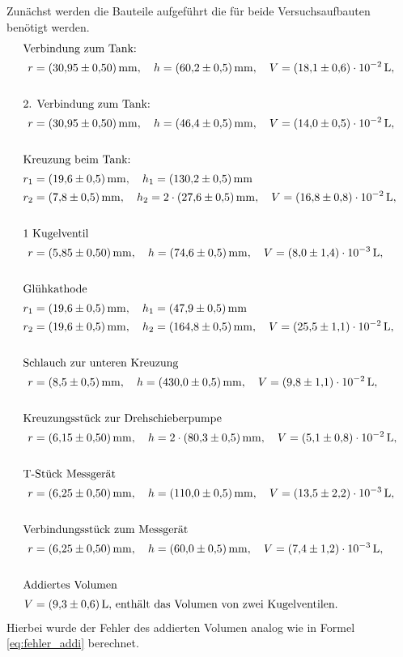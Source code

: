 Zunächst werden die Bauteile aufgeführt die für beide Versuchsaufbauten benötigt werden.
\begin{align*}
  \shortintertext{Verbindung zum Tank:}
  r&=\SI{30.95\pm 0.5}{\milli\meter}, \quad h=\SI{60.2\pm0.5}{\milli\meter}, \quad V=\SI{ 18.1\pm0.6 e-2}{\litre},\\
  \\
  \shortintertext{2. Verbindung zum Tank:}
  r&=\SI{30.95\pm 0.5}{\milli\meter}, \quad h=\SI{46.4\pm0.5}{\milli\meter}, \quad V=\SI{ 14.0\pm0.5 e-2}{\litre},\\
  \\
  \shortintertext{Kreuzung beim Tank:}
  r_1&=\SI{19.6\pm 0.5}{\milli\meter}, \quad h_1=\SI{130.2\pm0.5}{\milli\meter}\\
  r_2&=\SI{7.8\pm 0.5}{\milli\meter}, \quad h_2=2\cdot  \SI{27.6\pm0.5}{\milli\meter}, \quad V=\SI{ 16.8\pm0.8 e-2}{\litre},\\
  \\
  \shortintertext{1 Kugelventil}
  r&=\SI{5.85\pm 0.5}{\milli\meter}, \quad h=\SI{74.6\pm0.5}{\milli\meter}, \quad V=\SI{ 8.0\pm1.4 e-3}{\litre},\\
  \\
  \shortintertext{Glühkathode}
  r_1&=\SI{19.6\pm 0.5}{\milli\meter}, \quad h_1=\SI{47.9\pm0.5}{\milli\meter}\\
  r_2&=\SI{19.6\pm 0.5}{\milli\meter}, \quad h_2=\SI{164.8\pm0.5}{\milli\meter}, \quad V=\SI{ 25.5\pm1.1 e-2}{\litre},\\
  \\
  \shortintertext{Schlauch zur unteren Kreuzung}
  r&=\SI{8.5\pm 0.5}{\milli\meter}, \quad h=\SI{430\pm0.5}{\milli\meter}, \quad V=\SI{ 9.8\pm1.1 e-2}{\litre},\\
  \\
  \shortintertext{Kreuzungsstück zur Drehschieberpumpe}
  r&=\SI{6.15\pm 0.5}{\milli\meter}, \quad h=2\cdot\SI{80.3\pm0.5}{\milli\meter}, \quad V=\SI{ 5.1\pm0.8 e-2}{\litre},\\
  \\
  \shortintertext{T-Stück Messgerät}
  r&=\SI{6.25\pm 0.5}{\milli\meter}, \quad h=\SI{110\pm0.5}{\milli\meter}, \quad V=\SI{ 13.5\pm2.2 e-3}{\litre},\\
  \\
  \shortintertext{Verbindungsstück zum Messgerät}
  r&=\SI{6.25\pm 0.5}{\milli\meter}, \quad h=\SI{60\pm0.5}{\milli\meter}, \quad V=\SI{ 7.4\pm1.2 e-3}{\litre},\\
  \\
  \shortintertext{Addiertes Volumen}
  V&=\SI{ 9.3\pm0.6}{\litre},\,  \text{enthält das Volumen von zwei Kugelventilen}.
\end{align*}
Hierbei wurde der Fehler des addierten Volumen analog wie in Formel \ref{eq:fehler_addi} berechnet.

